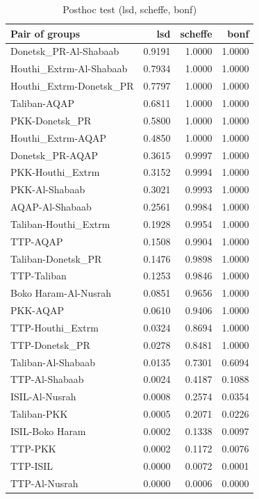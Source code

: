 \documentclass[11pt,oneside,a4paper]{reedthesis}
\begin{document}
\begin{table}[H]

\caption{\label{tab:unnamed-chunk-32}Posthoc test (lsd, scheffe, bonf)}
\centering
\fontsize{10}{12}\selectfont
\begin{tabular}[t]{lrrr}
\toprule
Pair of groups & lsd & scheffe & bonf\\
\midrule
Donetsk\_PR-Al-Shabaab & 0.9191 & 1.0000 & 1.0000\\
Houthi\_Extrm-Al-Shabaab & 0.7934 & 1.0000 & 1.0000\\
Houthi\_Extrm-Donetsk\_PR & 0.7797 & 1.0000 & 1.0000\\
Taliban-AQAP & 0.6811 & 1.0000 & 1.0000\\
PKK-Donetsk\_PR & 0.5800 & 1.0000 & 1.0000\\
\addlinespace
Houthi\_Extrm-AQAP & 0.4850 & 1.0000 & 1.0000\\
Donetsk\_PR-AQAP & 0.3615 & 0.9997 & 1.0000\\
PKK-Houthi\_Extrm & 0.3152 & 0.9994 & 1.0000\\
PKK-Al-Shabaab & 0.3021 & 0.9993 & 1.0000\\
AQAP-Al-Shabaab & 0.2561 & 0.9984 & 1.0000\\
\addlinespace
Taliban-Houthi\_Extrm & 0.1928 & 0.9954 & 1.0000\\
TTP-AQAP & 0.1508 & 0.9904 & 1.0000\\
Taliban-Donetsk\_PR & 0.1476 & 0.9898 & 1.0000\\
TTP-Taliban & 0.1253 & 0.9846 & 1.0000\\
Boko Haram-Al-Nusrah & 0.0851 & 0.9656 & 1.0000\\
\addlinespace
PKK-AQAP & 0.0610 & 0.9406 & 1.0000\\
TTP-Houthi\_Extrm & 0.0324 & 0.8694 & 1.0000\\
TTP-Donetsk\_PR & 0.0278 & 0.8481 & 1.0000\\
Taliban-Al-Shabaab & 0.0135 & 0.7301 & 0.6094\\
TTP-Al-Shabaab & 0.0024 & 0.4187 & 0.1088\\
\addlinespace
ISIL-Al-Nusrah & 0.0008 & 0.2574 & 0.0354\\
Taliban-PKK & 0.0005 & 0.2071 & 0.0226\\
ISIL-Boko Haram & 0.0002 & 0.1338 & 0.0097\\
TTP-PKK & 0.0002 & 0.1172 & 0.0076\\
TTP-ISIL & 0.0000 & 0.0072 & 0.0001\\
\addlinespace
TTP-Al-Nusrah & 0.0000 & 0.0006 & 0.0000\\

\end{tabular}
\end{table}
\end{document}
